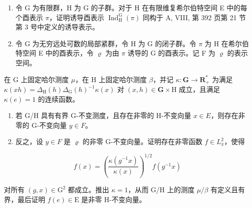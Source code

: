 \begin{enumerate}
\def\labelenumi{\arabic{enumi})}
\setcounter{enumi}{18}
\item
  令 G 为有限群，H 为 G 的子群。对于 H 在有限维复希尔伯特空间 E 中的每个酉表示 \(\pi\)，证明诱导酉表示 \(\operatorname{Ind}_{\mathrm{H}}^{\mathrm{G}}(\pi)\) 同构于 A, VIII, 第 392 页第 21 节第 3 号中定义的诱导表示。
\item
  令 G 为无穷远处可数的局部紧群，令 H 为 G 的闭子群。令 \(\pi\) 为 H 在希尔伯特空间 E 中的酉表示，令 \(\varrho\) 为由 \(\pi\) 诱导的 G 的酉表示。记 F 为 \(\varrho\) 的表示空间。
\end{enumerate}

在 G 上固定哈尔测度 \(\mu\)，在 H 上固定哈尔测度 \(\beta\)，并记 \(\kappa\colon\mathbf{G}\to\mathbf{R}_{+}^{*}\) 为满足 \(\kappa(xh)=\Delta_{\mathrm{H}}(h)\Delta_{\mathrm{G}}(h)^{-1}\kappa(x)\) 对 \((x,h)\in\mathbf{G}\times\mathrm{H}\) 成立，且满足 \(\kappa(e)=1\) 的连续函数。

\begin{enumerate}
\def\labelenumi{\alph{enumi})}
\item
  若 G/H 具有有界 G-不变测度，且存在非零的 H-不变向量 \(x \in E\)，则存在非零的 G-不变向量 \(y \in F\)。
\item
  反之，设 \(y \in F\) 是 \(\varrho\) 的非零 G-不变向量。证明存在非零函数 \(f \in L_{\overline{\pi}}^{2}\)，使得
\end{enumerate}

\[
f (x) = \left(\frac {\kappa (g ^ {- 1} x)}{\kappa (x)}\right) ^ {1 / 2} f (g ^ {- 1} x)
\]

对所有 \((g, x) \in \mathrm{G}^{2}\) 都成立。推出 \(\kappa = 1\)，从而 G/H 上的测度 \(\mu/\beta\) 有定义且有界，最后证明 \(f(e) \in \mathrm{E}\) 是非零 H-不变向量。
\relax{}
